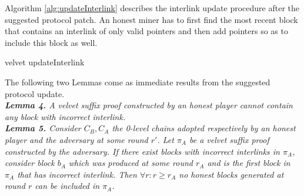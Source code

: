 Algorithm \ref{alg:updateInterlink} describes the interlink update procedure after the suggested protocol patch. An honest miner has to first find the most recent block that contains an interlink of only valid pointers and then add pointers so as to include this block as well.
\vspace{4mm}

\begin{algorithm}[H]
\SetAlgoNoLine
\DontPrintSemicolon
{}
\vspace{4mm}

\vspace{4mm}
 \caption{velvet updateInterlink}
 \label{alg:updateInterlink}
\end{algorithm}

\vspace{4mm}

The following two Lemmas come as immediate results from the suggested protocol update.\\

\textit{\textbf{Lemma 4.} A velvet suffix proof constructed by an honest player cannot contain any block with incorrect interlink.}\\

\textit{\textbf{Lemma 5.} Consider $C_B, C_A$ the 0-level chains adopted respectively by an honest player and the adversary at some round $r'$. Let $\pi_A$ be a velvet suffix proof constructed by the adversary. If there exist blocks with incorrect interlinks in $\pi_A$, consider block $b_A$ which was produced at some round $r_A$ and is the first block in $\pi_A$ that has incorrect interlink. Then $\forall r: r \geq r_A$ no honest blocks generated at round $r$ can be included in $\pi_A$.} \\

